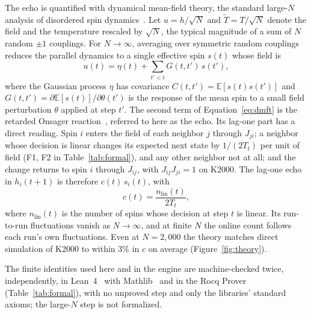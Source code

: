 The echo is quantified with dynamical mean-field theory, the standard large-$N$ analysis of disordered spin dynamics~\cite{sompolinsky1982relaxational,eissfeller1992new,coolen2001statistical}. Let $u=h/\sqrt{N}$ and $\tilde T=T/\sqrt{N}$ denote the field and the temperature rescaled by $\sqrt{N}$, the typical magnitude of a sum of $N$ random $\pm1$ couplings. For $N\to\infty$, averaging over symmetric random couplings reduces the parallel dynamics to a single effective spin $s(t)$ whose field is
\begin{equation}
  u(t)=\eta(t)+\sum_{t'<t}G(t,t')\,s(t'),
  \label{eq:dmft}
\end{equation}
where the Gaussian process $\eta$ has covariance $C(t,t')=\mathbb{E}[s(t)s(t')]$ and $G(t,t')=\partial\mathbb{E}[s(t)]/\partial\theta(t')$ is the response of the mean spin to a small field perturbation $\theta$ applied at step $t'$. The second term of Equation~\eqref{eq:dmft} is the retarded Onsager reaction~\cite{thouless1977solution}, referred to here as the echo. Its lag-one part has a direct reading. Spin $i$ enters the field of each neighbor $j$ through $J_{ji}$; a neighbor whose decision is linear changes its expected next state by $1/(2T_t)$ per unit of field (F1, F2 in Table~\ref{tab:formal}), and any other neighbor not at all; and the change returns to spin $i$ through $J_{ij}$, with $J_{ij}J_{ji}=1$ on K2000. The lag-one echo in $h_i(t{+}1)$ is therefore $c(t)\,s_i(t)$, with
\begin{equation}
  c(t)=\frac{n_{\mathrm{lin}}(t)}{2T_t},
  \label{eq:c}
\end{equation}
where $n_{\mathrm{lin}}(t)$ is the number of spins whose decision at step $t$ is linear. Its run-to-run fluctuations vanish as $N\to\infty$, and at finite $N$ the online count follows each run's own fluctuations. Even at $N=2{,}000$ the theory matches direct simulation of K2000 to within 3\% in $c$ on average (Figure~\ref{fig:theory}).

The finite identities used here and in the engine are machine-checked twice, independently, in Lean~4~\cite{demoura2021lean4} with Mathlib~\cite{mathlib2020} and in the Rocq Prover~\cite{rocq2026} (Table~\ref{tab:formal}), with no unproved step and only the libraries' standard axioms; the large-$N$ step is not formalized.

